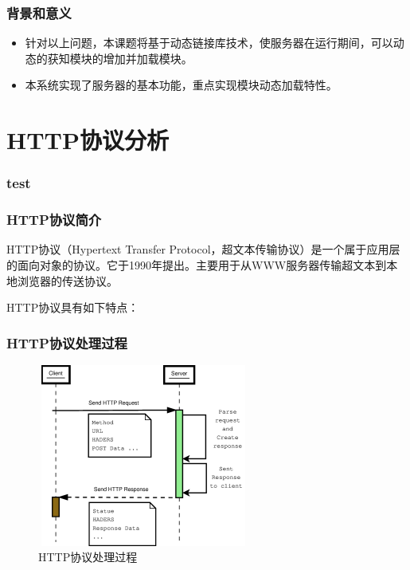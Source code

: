 \documentclass[12pt,dvipdfm]{beamer}
\begin{document}
\begin{frame}
	\frametitle{背景和意义}
	\begin{itemize}
		\item 针对以上问题，本课题将基于动态链接库技术，使服务器在运行期间，可以动态的获知模块的增加并加载模块。
		\pause
		\item 本系统实现了服务器的基本功能，重点实现模块动态加载特性。
	\end{itemize}
\end{frame}

\section{HTTP协议分析}

\begin{frame}
	\frametitle{test}
\end{frame}

\begin{frame}
	\frametitle{HTTP协议简介}
	
HTTP协议（Hypertext Transfer Protocol，超文本传输协议）是一个属于应用层的面向对象的协议。它于1990年提出。主要用于从WWW服务器传输超文本到本地浏览器的传送协议。

HTTP协议具有如下特点：
\end{frame}

\begin{frame}
	\frametitle{HTTP协议处理过程}
	\begin{figure}[htbp]
	\centering
	\caption{HTTP协议处理过程}
	\includegraphics[height=6cm, width=7cm]{http.eps}
	\end{figure}
\end{frame}
\end{document}
